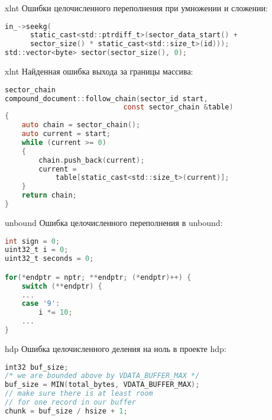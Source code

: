 \documentclass[10pt]{beamer}
\begin{document}
\begin{frame}[fragile]{xlnt}
Ошибки целочисленного переполнения при умножении и сложении:
\tiny
\begin{lstlisting}[language=C, basicstyle=\small\ttfamily,
                   xleftmargin=1em,
                   captionpos=b,
                   label=lst:xlnt-overflow]
in_->seekg(
      static_cast<std::ptrdiff_t>(sector_data_start() +
      sector_size() * static_cast<std::size_t>(id)));
std::vector<byte> sector(sector_size(), 0);
\end{lstlisting}
\end{frame}

\begin{frame}[fragile]{xlnt}
Найденная ошибка выхода за границы массива:
\begin{lstlisting}[language=C, basicstyle=\small\ttfamily,
                   xleftmargin=1em,
                   captionpos=b,
                   label=lst:xlnt-oob]
sector_chain
compound_document::follow_chain(sector_id start,
                            const sector_chain &table)
{
    auto chain = sector_chain();
    auto current = start;
    while (current >= 0)
    {
        chain.push_back(current);
        current =
            table[static_cast<std::size_t>(current)];
    }
    return chain;
}
\end{lstlisting}
\end{frame}

\begin{frame}[fragile]{unbound}
Ошибка целочисленного переполнения в unbound:
\begin{lstlisting}[language=C, basicstyle=\small\ttfamily,
                   xleftmargin=1em,
                   captionpos=b,
                   label=lst:unbound_overflow]
int sign = 0;
uint32_t i = 0;
uint32_t seconds = 0;

for(*endptr = nptr; **endptr; (*endptr)++) {
    switch (**endptr) {
    ...
    case '9':
        i *= 10;
    ...
}
\end{lstlisting}
\end{frame}

\begin{frame}[fragile]{hdp}
Ошибка целочисленного деления на ноль в проекте hdp:
\begin{lstlisting}[language=C, basicstyle=\small\ttfamily,
                   xleftmargin=1em,
                   captionpos=b,
                   label=lst:hdp-zerodiv]
int32 buf_size;
/* we are bounded above by VDATA_BUFFER_MAX */
buf_size = MIN(total_bytes, VDATA_BUFFER_MAX);
// make sure there is at least room
// for one record in our buffer
chunk = buf_size / hsize + 1;
\end{lstlisting}
\end{frame}
\end{document}
